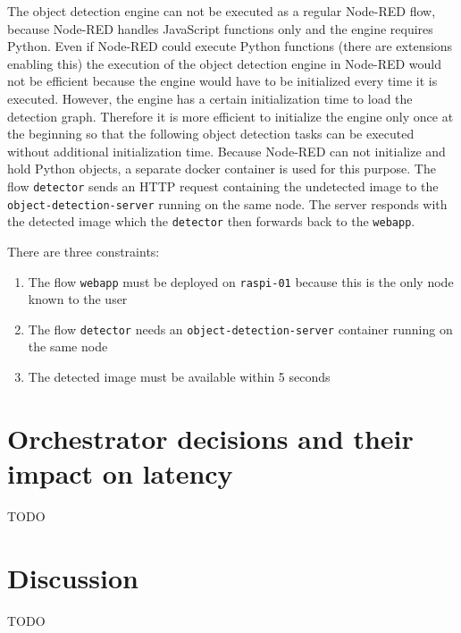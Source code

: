 The object detection engine can not be executed as a regular Node-RED flow, because Node-RED handles JavaScript functions only and the engine requires Python. Even if Node-RED could execute Python functions (there are extensions enabling this) the execution of the object detection engine in Node-RED would not be efficient because the engine would have to be initialized every time it is executed. However, the engine has a certain initialization time to load the detection graph. Therefore it is more efficient to initialize the engine only once at the beginning so that the following object detection tasks can be executed without additional initialization time. Because Node-RED can not initialize and hold Python objects, a separate docker container is used for this purpose. The flow \texttt{detector} sends an HTTP request containing the undetected image to the \texttt{object-detection-server} running on the same node. The server responds with the detected image which the \texttt{detector} then forwards back to the \texttt{webapp}.

There are three constraints:
\begin{enumerate}
    \item The flow \texttt{webapp} must be deployed on \texttt{raspi-01} because this is the only node known to the user
    \item The flow \texttt{detector} needs an \texttt{object-detection-server} container running on the same node
    \item The detected image must be available within 5 seconds
\end{enumerate}

\section{Orchestrator decisions and their impact on latency}

TODO

\section{Discussion}

TODO
